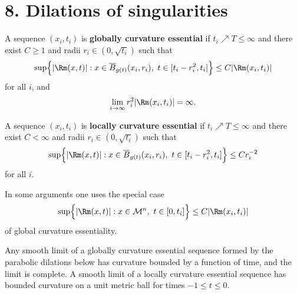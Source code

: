 \section*{8. Dilations of singularities}

\begin{definition}
\label{ch08-def-globally-curvature-essential}

A sequence \((x_i,t_i)\) is \textbf{globally curvature essential} if \(t_i\nearrow T\le\infty\) and there exist \(C\ge1\) and radii \(r_i\in(0,\sqrt{t_i})\) such that
\[
\sup\Bigl\{ |\Rm(x,t)| : x\in \overline B_{g(t)}(x_i,r_i),\ t\in[t_i-r_i^2,t_i]\Bigr\}
\le C |\Rm(x_i,t_i)|
\]
for all \(i\), and
\[
\lim_{i\to\infty} r_i^2 |\Rm(x_i,t_i)|=\infty.
\]
\end{definition}

\begin{definition}
\label{ch08-def-locally-curvature-essential}

A sequence \((x_i,t_i)\) is \textbf{locally curvature essential} if \(t_i\nearrow T\le\infty\) and there exist \(C<\infty\) and radii \(r_i\in(0,\sqrt{t_i})\) such that
\[
\sup\Bigl\{ |\Rm(x,t)| : x\in \overline B_{g(t)}(x_i,r_i),\ t\in[t_i-r_i^2,t_i]\Bigr\}
\le C r_i^{-2}
\]
for all \(i\).
\end{definition}

\begin{remark}
\label{ch08-rem-globally-essential-sequences}

In some arguments one uses the special case
\[
\sup\Bigl\{ |\Rm(x,t)| : x\in \mathcal M^n,\ t\in[0,t_i]\Bigr\}\le C|\Rm(x_i,t_i)|
\]
of global curvature essentiality.
\end{remark}

\begin{remark}
\label{ch08-rem-essentiality-consequences}

Any smooth limit of a globally curvature essential sequence formed by the parabolic dilations below has curvature bounded by a function of time, and the limit is complete. A smooth limit of a locally curvature essential sequence has bounded curvature on a unit metric ball for times \(-1\le t\le0\).
\end{remark}

